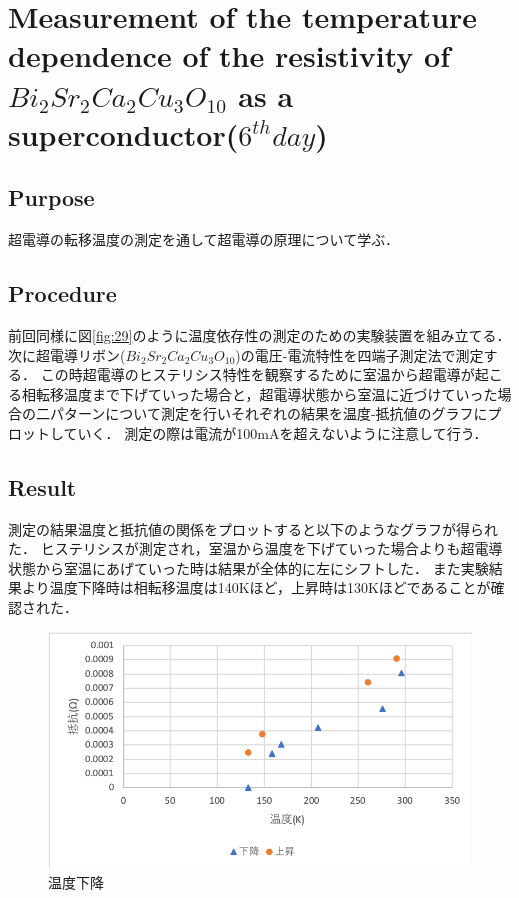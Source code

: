 \documentclass[11pt, a4paper,twocolumn]{jarticle}
\begin{document}
\section{Measurement of the temperature dependence of the resistivity of $Bi_2Sr_2Ca_2Cu_3O_{10}$ as a superconductor($6^{th} day$)}

\subsection{Purpose}
超電導の転移温度の測定を通して超電導の原理について学ぶ．
\subsection{Procedure}
前回同様に図\ref{fig:29}のように温度依存性の測定のための実験装置を組み立てる．
次に超電導リボン($Bi_2Sr_2Ca_2Cu_3O_{10}$)の電圧-電流特性を四端子測定法で測定する．
この時超電導のヒステリシス特性を観察するために室温から超電導が起こる相転移温度まで下げていった場合と，超電導状態から室温に近づけていった場合の二パターンについて測定を行いそれぞれの結果を温度-抵抗値のグラフにプロットしていく．
測定の際は電流が100mAを超えないように注意して行う．

\subsection{Result}
測定の結果温度と抵抗値の関係をプロットすると以下のようなグラフが得られた．
ヒステリシスが測定され，室温から温度を下げていった場合よりも超電導状態から室温にあげていった時は結果が全体的に左にシフトした．
また実験結果より温度下降時は相転移温度は140Kほど，上昇時は130Kほどであることが確認された．

\begin{figure}[htbp]
 \begin{center}
  \includegraphics[width=0.8\linewidth]{fig39.png}
 \end{center}
 \caption{温度下降}
 \label{fig:39}
\end{figure}
\end{document}
